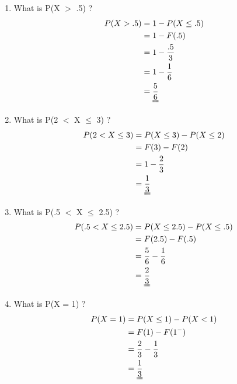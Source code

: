 \documentclass[letterpaper,12pt]{article}
\begin{document}
\begin{enumerate}[label=(\alph*)]
    \item{What is P(X $>$ .5) ?} \\
        \begin{align*}
            P(X > .5) & = 1 - P(X \leq .5) \\
            & = 1 - F(.5) \\
            & = 1 - \frac{.5}{3} \\
            & = 1 - \frac{1}{6} \\
            & = \uuline{\frac{5}{6}} \\
        \end{align*}
    \item{What is P(2 $<$ X $\leq$ 3) ?} \\
        \begin{align*}
            P(2 < X \leq 3) & = P(X \leq 3) - P(X \leq 2) \\
            & = F(3) - F(2) \\
            & = 1 - \frac{2}{3} \\
            & = \uuline{\frac{1}{3}} \\
        \end{align*}
    \item{What is P(.5 $<$ X $\leq$ 2.5) ?} \\
        \begin{align*}
            P(.5 < X \leq 2.5) & = P(X \leq 2.5) - P(X \leq .5) \\
            & = F(2.5) - F(.5) \\
            & = \frac{5}{6} - \frac{1}{6} \\
            & = \uuline{\frac{2}{3}} \\
        \end{align*}
    \item{What is P(X = 1) ?} \\
        \begin{align*}
            P(X = 1) & = P(X \leq 1) - P(X < 1) \\
            & = F(1) - F(1^{-}) \\
            & = \frac{2}{3} - \frac{1}{3} \\
            & = \uuline{\frac{1}{3}} \\
        \end{align*}
\end{enumerate}
\end{document}
